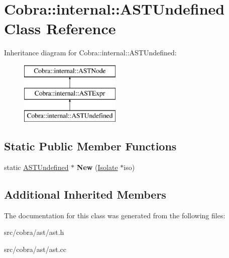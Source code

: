 \hypertarget{class_cobra_1_1internal_1_1_a_s_t_undefined}{\section{Cobra\+:\+:internal\+:\+:A\+S\+T\+Undefined Class Reference}
\label{class_cobra_1_1internal_1_1_a_s_t_undefined}
}
Inheritance diagram for Cobra\+:\+:internal\+:\+:A\+S\+T\+Undefined\+:\begin{figure}[H]
\begin{center}
\leavevmode
\includegraphics[height=3.000000cm]{class_cobra_1_1internal_1_1_a_s_t_undefined}
\end{center}
\end{figure}
\subsection*{Static Public Member Functions}
\begin{DoxyCompactItemize}
\item 
\hypertarget{class_cobra_1_1internal_1_1_a_s_t_undefined_a529348acb8638f26b5ded1ed8c12b769}{static \hyperlink{class_cobra_1_1internal_1_1_a_s_t_undefined}{A\+S\+T\+Undefined} $\ast$ {\bfseries New} (\hyperlink{class_cobra_1_1internal_1_1_isolate}{Isolate} $\ast$iso)}\label{class_cobra_1_1internal_1_1_a_s_t_undefined_a529348acb8638f26b5ded1ed8c12b769}

\end{DoxyCompactItemize}
\subsection*{Additional Inherited Members}


The documentation for this class was generated from the following files\+:\begin{DoxyCompactItemize}
\item 
src/cobra/ast/ast.\+h\item 
src/cobra/ast/ast.\+cc\end{DoxyCompactItemize}
